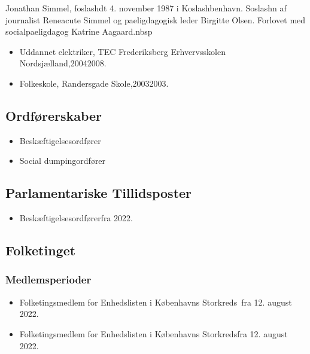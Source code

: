 \documentclass[11pt, a4paper]{awesome-cv}
\begin{document}
\makecvheader[R]
\makelettertitle
\begin{cvletter}
Jonathan Simmel, foslashdt 4. november 1987 i Koslashbenhavn. Soslashn af journalist Reneacute Simmel og paeligdagogisk leder Birgitte Olsen. Forlovet med socialpaeligdagog Katrine Aagaard.nbsp

\begin{itemize}
\item Uddannet elektriker, TEC Frederiksberg Erhvervsskolen Nordsjælland,20042008.
\item Folkeskole, Randersgade Skole,20032003.
\end{itemize}
\subsection*{Ordførerskaber}
\begin{itemize}
\item Beskæftigelsesordfører
\item Social dumpingordfører
\end{itemize}
\subsection*{Parlamentariske Tillidsposter}
\begin{itemize}
\item Beskæftigelsesordførerfra 2022.
\end{itemize}
\subsection*{Folketinget}
\subsubsection*{Medlemsperioder}
\begin{itemize}
\item Folketingsmedlem for Enhedslisten i Københavns Storkreds fra 12. august 2022.
\item Folketingsmedlem for Enhedslisten i Københavns Storkredsfra 12. august 2022.
\end{itemize}

\end{cvletter}
\end{document}
